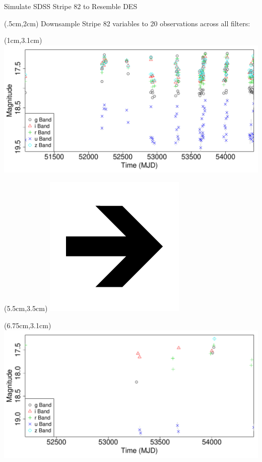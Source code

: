\documentclass[12pt]{beamer}
\begin{document}
\begin{frame}{Simulate SDSS Stripe 82 to Resemble DES}

  \begin{textblock*}{12cm}(.5cm,2cm) %
Downsample Stripe 82 variables to 20 observations across all filters:
\end{textblock*}

  \begin{textblock*}{3cm}(1cm,3.1cm) %
\includegraphics[scale=.15]{figs/unfolded_13350.pdf}
\end{textblock*}


  \begin{textblock*}{3cm}(5.5cm,3.5cm) %
\includegraphics[scale=.15]{figs/rightarrow.png}
\end{textblock*}

  \begin{textblock*}{3cm}(6.75cm,3.1cm) %
\includegraphics[scale=.15]{figs/unfolded_13350down.pdf}
\end{textblock*}


\end{frame}
\end{document}
